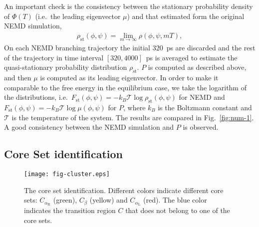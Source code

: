 \documentclass[journal=jctcce,manuscript=article]{achemso}
\newcommand{\mymu}{\mu}
\newcommand{\dih}{\textrm{dih}}
\newcommand{\confaa}[0]{{\alpha_{\textrm{R}}}}
\newcommand{\confc}[0]{{\alpha_{\textrm{L}}}}
\begin{document}
An important check is the consistency between the
stationary probability density of $\Phi(T)$ (i.e.~the leading eigenvector $\mymu$) and that 
estimated form the original NEMD simulation,
\begin{align}
  \label{eq:num-tmp1}
  \rho_{\textrm{st}}(\phi,\psi) = \lim_{m\rightarrow\infty} \rho (\phi,\psi,mT),
\end{align}
On each NEMD branching trajectory the initial 320~ps are discarded and
the rest of the trajectory in time interval $[320,4000]$~ps is averaged to estimate
the quasi-stationary probability distribution $\rho_{\textrm{st}}$. 
$P$ is computed as described above, and then $\mymu$ is computed as its leading eigenvector. In order to make it comparable to the free energy in the equilibrium case, we take
the logarithm of the distributions, i.e.~$F_{\textrm{st}}(\phi,\psi)=
-k_B\mathcal T\log \rho_{\textrm{st}}(\phi,\psi)$
for NEMD and $F_{\textrm{st}}(\phi,\psi)=
-k_B\mathcal T\log \mu(\phi,\psi)$ for $P$, where $k_B$ is the
Boltzmann constant and $\mathcal T$ is the temperature of the system.
The
results are  compared in Fig.~\ref{fig:num-1}. A good consistency between
the  NEMD simulation and 
$P$ is observed.  


\subsection{Core Set identification}

\begin{figure}
  \centering
  \texttt{[image: fig-cluster.eps]}
  \caption{The core set identification. Different colors indicate different core sets: $C_{\confaa}$ (green), $C_\beta$ (yellow) and $C_{\confc}$ (red).
    The blue color indicates the transition region $C$ that does not belong to one of the core sets.}
  \label{fig:cluster}
\end{figure}
\end{document}
